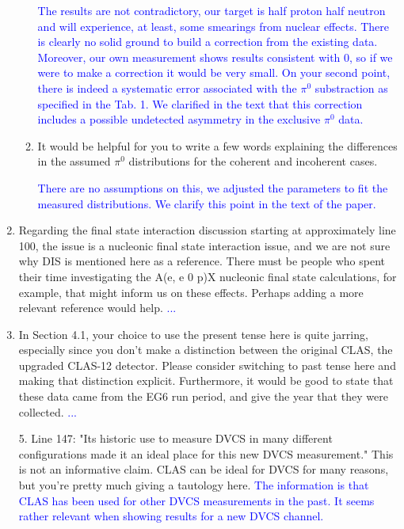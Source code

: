\documentclass[a4paper,11pt,twoside]{article}
\begin{document}
\begin{enumerate}
\begin{enumerate}
   \textcolor{blue}{The results are not contradictory, our target is half proton half neutron and will experience,
at least, some smearings from nuclear effects. There is clearly no solid ground to build a correction from the 
existing data. Moreover, our own measurement shows results consistent with 0, so if we were to make a correction
it would be very small. On your second point, there is indeed
a systematic error associated with the $\pi^0$ substraction as specified in the Tab. 1. We clarified in the text that 
this correction includes a possible undetected asymmetry in the exclusive $\pi^0$ data.}

\item It would be helpful for you to write a few words explaining the differences in the assumed $\pi^0$ distributions
for the coherent and incoherent cases.

   \textcolor{blue}{There are no assumptions on this, we adjusted the parameters to fit the measured distributions.
We clarify this point in the text of the paper.}

\end{enumerate}

\item  Regarding the final state interaction discussion starting at approximately line 100, the issue is a nucleonic
final state interaction issue, and we are not sure why DIS is mentioned here as a reference. There must be
people who spent their time investigating the A(e, e 0 p)X nucleonic final state calculations, for example, that
might inform us on these effects. Perhaps adding a more relevant reference would help.
   \textcolor{blue}{...}

\item  In Section 4.1, your choice to use the present tense here is quite jarring, especially since you don't make a
distinction between the original CLAS, the upgraded CLAS-12 detector. Please consider switching to past
tense here and making that distinction explicit. Furthermore, it would be good to state that these data came
from the EG6 run period, and give the year that they were collected.
   \textcolor{blue}{...}

5. Line 147: "Its historic use to measure DVCS in many different configurations made it an ideal place for this
new DVCS measurement."
This is not an informative claim. CLAS can be ideal for DVCS for many reasons, but you're pretty much
giving a tautology here.
   \textcolor{blue}{The information is that CLAS has been used for other DVCS measurements in the past. It seems
rather relevant when showing results for a new DVCS channel.}


\end{enumerate}
\end{document}
